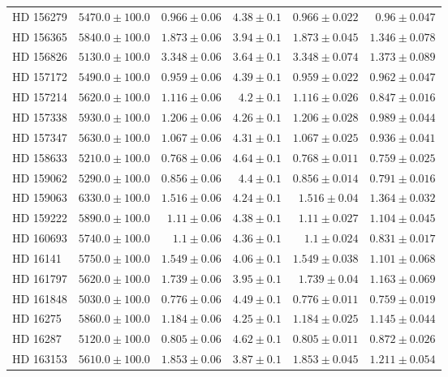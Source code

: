 \begin{longtable*}{lrrrrr}
HD 156279 & $5470.0\pm 100.0$ & $0.966\pm 0.06$ & $4.38\pm 0.1$ & $0.966\pm 0.022$ & $0.96\pm 0.047$ \\ 
HD 156365 & $5840.0\pm 100.0$ & $1.873\pm 0.06$ & $3.94\pm 0.1$ & $1.873\pm 0.045$ & $1.346\pm 0.078$ \\ 
HD 156826 & $5130.0\pm 100.0$ & $3.348\pm 0.06$ & $3.64\pm 0.1$ & $3.348\pm 0.074$ & $1.373\pm 0.089$ \\ 
HD 157172 & $5490.0\pm 100.0$ & $0.959\pm 0.06$ & $4.39\pm 0.1$ & $0.959\pm 0.022$ & $0.962\pm 0.047$ \\ 
HD 157214 & $5620.0\pm 100.0$ & $1.116\pm 0.06$ & $4.2\pm 0.1$ & $1.116\pm 0.026$ & $0.847\pm 0.016$ \\ 
HD 157338 & $5930.0\pm 100.0$ & $1.206\pm 0.06$ & $4.26\pm 0.1$ & $1.206\pm 0.028$ & $0.989\pm 0.044$ \\ 
HD 157347 & $5630.0\pm 100.0$ & $1.067\pm 0.06$ & $4.31\pm 0.1$ & $1.067\pm 0.025$ & $0.936\pm 0.041$ \\ 
HD 158633 & $5210.0\pm 100.0$ & $0.768\pm 0.06$ & $4.64\pm 0.1$ & $0.768\pm 0.011$ & $0.759\pm 0.025$ \\ 
HD 159062 & $5290.0\pm 100.0$ & $0.856\pm 0.06$ & $4.4\pm 0.1$ & $0.856\pm 0.014$ & $0.791\pm 0.016$ \\ 
HD 159063 & $6330.0\pm 100.0$ & $1.516\pm 0.06$ & $4.24\pm 0.1$ & $1.516\pm 0.04$ & $1.364\pm 0.032$ \\ 
HD 159222 & $5890.0\pm 100.0$ & $1.11\pm 0.06$ & $4.38\pm 0.1$ & $1.11\pm 0.027$ & $1.104\pm 0.045$ \\ 
HD 160693 & $5740.0\pm 100.0$ & $1.1\pm 0.06$ & $4.36\pm 0.1$ & $1.1\pm 0.024$ & $0.831\pm 0.017$ \\ 
HD 16141 & $5750.0\pm 100.0$ & $1.549\pm 0.06$ & $4.06\pm 0.1$ & $1.549\pm 0.038$ & $1.101\pm 0.068$ \\ 
HD 161797 & $5620.0\pm 100.0$ & $1.739\pm 0.06$ & $3.95\pm 0.1$ & $1.739\pm 0.04$ & $1.163\pm 0.069$ \\ 
HD 161848 & $5030.0\pm 100.0$ & $0.776\pm 0.06$ & $4.49\pm 0.1$ & $0.776\pm 0.011$ & $0.759\pm 0.019$ \\ 
HD 16275 & $5860.0\pm 100.0$ & $1.184\pm 0.06$ & $4.25\pm 0.1$ & $1.184\pm 0.025$ & $1.145\pm 0.044$ \\ 
HD 16287 & $5120.0\pm 100.0$ & $0.805\pm 0.06$ & $4.62\pm 0.1$ & $0.805\pm 0.011$ & $0.872\pm 0.026$ \\ 
HD 163153 & $5610.0\pm 100.0$ & $1.853\pm 0.06$ & $3.87\pm 0.1$ & $1.853\pm 0.045$ & $1.211\pm 0.054$ \\ 

\end{longtable*}
